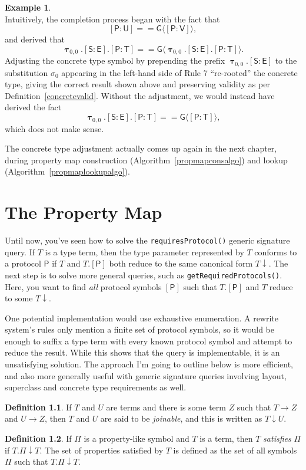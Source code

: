 \documentclass[headsepline,bibliography=totoc]{scrreport}
\newcommand{\namesym}[1]{\mathsf{#1}}
\newcommand{\proto}[1]{\bm{\mathsf{#1}}}
\newcommand{\protosym}[1]{[\proto{#1}]}
\newcommand{\genericsym}[2]{\bm{\uptau}_{#1,#2}}
\newcommand{\assocsym}[2]{[\proto{#1}\colon\namesym{#2}]}
\theoremstyle{definition}
\newtheorem{example}{Example}[chapter]
\theoremstyle{definition}
\newtheorem{definition}{Definition}[chapter]
\theoremstyle{definition}
\begin{document}
\begin{example}
\[\]
Intuitively, the completion process began with the fact that
\[\assocsym{P}{U}==\namesym{G}\langle\assocsym{P}{V}\rangle,\]
and derived that\
\[\genericsym{0}{0}.\assocsym{S}{E}.\assocsym{P}{T}==\namesym{G}\langle\genericsym{0}{0}.\assocsym{S}{E}.\assocsym{P}{T}\rangle.\]
Adjusting the concrete type symbol by prepending the prefix $\genericsym{0}{0}.\assocsym{S}{E}$ to the substitution $\sigma_0$ appearing in the left-hand side of Rule 7 ``re-rooted'' the concrete type, giving the correct result shown above and preserving validity as per Definition~\ref{concretevalid}. Without the adjustment, we would instead have derived the fact
\[\genericsym{0}{0}.\assocsym{S}{E}.\assocsym{P}{T}==\namesym{G}\langle\assocsym{P}{T}\rangle,\]
which does not make sense.
\end{example}
The concrete type adjustment actually comes up again in the next chapter, during property map construction (Algorithm~\ref{propmapconsalgo}) and lookup (Algorithm~\ref{propmaplookupalgo}).

\chapter{The Property Map}\label{propertymap}

Until now, you've seen how to solve the \texttt{requiresProtocol()} generic signature
query. If $T$ is a type term, then the type parameter represented by $T$ conforms to a protocol
$\proto{P}$ if $T$ and $T.\protosym{P}$ both reduce to the same canonical form ${T}{\downarrow}$. The next
step is to solve more general queries, such as \texttt{getRequiredProtocols()}. Here, you want to find
\emph{all} protocol symbols $\protosym{P}$ such that $T.\protosym{P}$ and $T$ reduce to some
${T}{\downarrow}$.

One potential implementation would use exhaustive enumeration. A rewrite system's rules only mention a
finite set of protocol symbols, so it would be enough to suffix a type term with every known
protocol symbol and attempt to reduce the result. While this shows that the query is implementable,
it is an unsatisfying solution. The approach I'm going to outline below is more efficient, and also more generally useful with generic signature queries involving layout, superclass and concrete type requirements as well.
\begin{definition} If $T$ and $U$ are terms and there is some term $Z$ such that $T\rightarrow Z$
and $U\rightarrow Z$, then $T$ and $U$ are said to be \emph{joinable}, and this is written as $T\downarrow U$.
\end{definition}
\begin{definition}
If $\Pi$ is a property-like symbol and $T$ is a term, then $T$ \emph{satisfies} $\Pi$ if $T.\Pi\downarrow T$. The set of properties satisfied by $T$ is defined as the set of all symbols $\Pi$ such that $T.\Pi\downarrow T$.
\end{definition}
\end{document}
